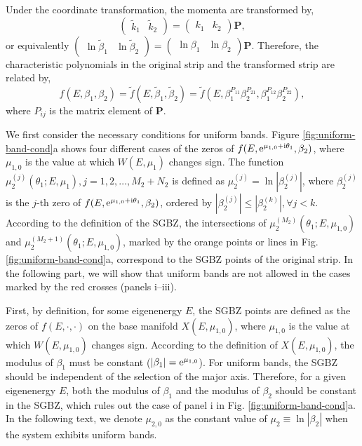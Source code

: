 \documentclass[pdflatex,sn-nature, iicol]{sn-jnl}%
\theoremstyle{thmstyleone}%
\theoremstyle{thmstyletwo}%
\theoremstyle{thmstylethree}%
\begin{document}
Under the coordinate transformation, the momenta are transformed by,
\begin{equation}
\begin{pmatrix}\tilde{k}_{1} & \tilde{k}_{2}\end{pmatrix}=\begin{pmatrix}k_{1} & k_{2}\end{pmatrix}\mathbf{P},\label{eq:transformation-k}
\end{equation}
or equivalently $\begin{pmatrix}\ln\tilde{\beta}_{1} & \ln\tilde{\beta}_{2}\end{pmatrix}=\begin{pmatrix}\ln\beta_{1} & \ln\beta_{2}\end{pmatrix}\mathbf{P}$.
Therefore, the characteristic polynomials in the original strip and
the transformed strip are related by, 
\begin{equation}
f\left(E,\beta_{1},\beta_{2}\right)=\tilde{f}\left(E,\tilde{\beta}_{1},\tilde{\beta}_{2}\right)=\tilde{f}\left(E,\beta_{1}^{P_{11}}\beta_{2}^{P_{21}},\beta_{1}^{P_{12}}\beta_{2}^{P_{22}}\right),\label{eq:ChP-relations}
\end{equation}
where $P_{ij}$ is the matrix element of $\mathbf{P}$.

We first consider the necessary conditions for uniform bands. Figure
\ref{fig:uniform-band-cond}a shows four different cases of the zeros
of $f(E,\mathrm{e}^{\mu_{1,0}+\mathrm{i}\theta_{1}},\beta_{2})$, where $\mu_{1,0}$
is the value at which $W(E,\mu_{1})$ changes sign. The function $\mu_{2}^{(j)}(\theta_{1};E,\mu_{1}),j=1,2,\dots,M_{2}+N_{2}$
is defined as $\mu_{2}^{(j)}=\ln|\beta_{2}^{(j)}|$, where $\beta_{2}^{(j)}$
is the $j$-th zero of $f(E,\mathrm{e}^{\mu_{1,0}+\mathrm{i}\theta_{1}},\beta_{2})$,
ordered by $|\beta_{2}^{(j)}|\leq|\beta_{2}^{(k)}|,\forall j<k$.
According to the definition of the SGBZ, the intersections of $\mu_{2}^{(M_{2})}(\theta_{1};E,\mu_{1,0})$
and $\mu_{2}^{(M_{2}+1)}(\theta_{1};E,\mu_{1,0})$, marked by the
orange points or lines in Fig. \ref{fig:uniform-band-cond}a, correspond
to the SGBZ points of the original strip. In the following part, we
will show that uniform bands are not allowed in the cases marked by
the red crosses (panels i--iii).

First, by definition, for some eigenenergy $E$, the SGBZ points are
defined as the zeros of $f(E,\cdot,\cdot)$ on the base manifold $X(E,\mu_{1,0})$,
where $\mu_{1,0}$ is the value at which $W(E,\mu_{1,0})$ changes
sign. According to the definition of $X(E,\mu_{1,0})$, the modulus
of $\beta_{1}$ must be constant ($|\beta_{1}|=\mathrm{e}^{\mu_{1,0}}$).
For uniform bands, the SGBZ should be independent of the selection
of the major axis. Therefore, for a given eigenenergy $E$, both the
modulus of $\beta_{1}$ and the modulus of $\beta_{2}$ should be
constant in the SGBZ, which rules out the case of panel i in Fig.
\ref{fig:uniform-band-cond}a. In the following text, we denote $\mu_{2,0}$
as the constant value of $\mu_{2}\equiv\ln|\beta_{2}|$ when the system
exhibits uniform bands.
\end{document}
